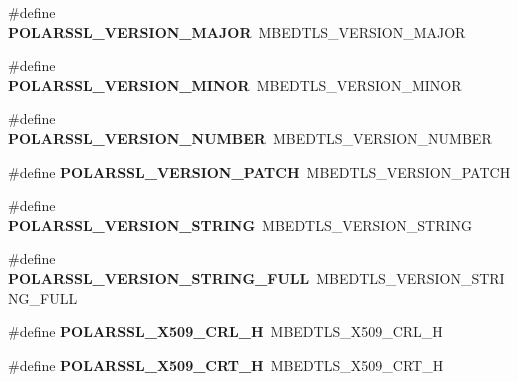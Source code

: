 \begin{DoxyCompactItemize}
\item 
\mbox{\label{compat-1_83_8h_a7b2767c47fe157b1fe766ca30cf37bbc}} 
\#define {\bfseries P\+O\+L\+A\+R\+S\+S\+L\+\_\+\+V\+E\+R\+S\+I\+O\+N\+\_\+\+M\+A\+J\+OR}~M\+B\+E\+D\+T\+L\+S\+\_\+\+V\+E\+R\+S\+I\+O\+N\+\_\+\+M\+A\+J\+OR
\item 
\mbox{\label{compat-1_83_8h_a6b6e1f4fcc43a274d44c4eb176ce35ba}} 
\#define {\bfseries P\+O\+L\+A\+R\+S\+S\+L\+\_\+\+V\+E\+R\+S\+I\+O\+N\+\_\+\+M\+I\+N\+OR}~M\+B\+E\+D\+T\+L\+S\+\_\+\+V\+E\+R\+S\+I\+O\+N\+\_\+\+M\+I\+N\+OR
\item 
\mbox{\label{compat-1_83_8h_a8a3f68a90790a378a533add3660ef1f2}} 
\#define {\bfseries P\+O\+L\+A\+R\+S\+S\+L\+\_\+\+V\+E\+R\+S\+I\+O\+N\+\_\+\+N\+U\+M\+B\+ER}~M\+B\+E\+D\+T\+L\+S\+\_\+\+V\+E\+R\+S\+I\+O\+N\+\_\+\+N\+U\+M\+B\+ER
\item 
\mbox{\label{compat-1_83_8h_aef722623c9ac01acf886d3517ad3d62a}} 
\#define {\bfseries P\+O\+L\+A\+R\+S\+S\+L\+\_\+\+V\+E\+R\+S\+I\+O\+N\+\_\+\+P\+A\+T\+CH}~M\+B\+E\+D\+T\+L\+S\+\_\+\+V\+E\+R\+S\+I\+O\+N\+\_\+\+P\+A\+T\+CH
\item 
\mbox{\label{compat-1_83_8h_aa460d4012331fc73ed6b324512b49b61}} 
\#define {\bfseries P\+O\+L\+A\+R\+S\+S\+L\+\_\+\+V\+E\+R\+S\+I\+O\+N\+\_\+\+S\+T\+R\+I\+NG}~M\+B\+E\+D\+T\+L\+S\+\_\+\+V\+E\+R\+S\+I\+O\+N\+\_\+\+S\+T\+R\+I\+NG
\item 
\mbox{\label{compat-1_83_8h_a17f8642e62f11a2a034a99c8a042f710}} 
\#define {\bfseries P\+O\+L\+A\+R\+S\+S\+L\+\_\+\+V\+E\+R\+S\+I\+O\+N\+\_\+\+S\+T\+R\+I\+N\+G\+\_\+\+F\+U\+LL}~M\+B\+E\+D\+T\+L\+S\+\_\+\+V\+E\+R\+S\+I\+O\+N\+\_\+\+S\+T\+R\+I\+N\+G\+\_\+\+F\+U\+LL
\item 
\mbox{\label{compat-1_83_8h_a5190ef194fd4a84c89cb501738fe73e5}} 
\#define {\bfseries P\+O\+L\+A\+R\+S\+S\+L\+\_\+\+X509\+\_\+\+C\+R\+L\+\_\+H}~M\+B\+E\+D\+T\+L\+S\+\_\+\+X509\+\_\+\+C\+R\+L\+\_\+H
\item 
\mbox{\label{compat-1_83_8h_a5b8abf4f52d91df56d9ded69190dfdba}} 
\#define {\bfseries P\+O\+L\+A\+R\+S\+S\+L\+\_\+\+X509\+\_\+\+C\+R\+T\+\_\+H}~M\+B\+E\+D\+T\+L\+S\+\_\+\+X509\+\_\+\+C\+R\+T\+\_\+H

\end{DoxyCompactItemize}
